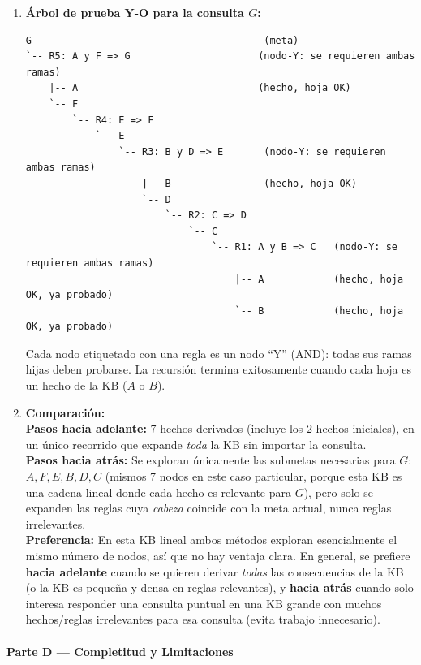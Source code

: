 \begin{enumerate}
    \item \textbf{Árbol de prueba Y-O para la consulta $G$:}
\begin{verbatim}
G                                        (meta)
`-- R5: A y F => G                      (nodo-Y: se requieren ambas ramas)
    |-- A                               (hecho, hoja OK)
    `-- F
        `-- R4: E => F
            `-- E
                `-- R3: B y D => E       (nodo-Y: se requieren ambas ramas)
                    |-- B                (hecho, hoja OK)
                    `-- D
                        `-- R2: C => D
                            `-- C
                                `-- R1: A y B => C   (nodo-Y: se requieren ambas ramas)
                                    |-- A            (hecho, hoja OK, ya probado)
                                    `-- B            (hecho, hoja OK, ya probado)

\end{verbatim}
    Cada nodo etiquetado con una regla es un nodo ``Y'' (AND): todas sus ramas hijas deben probarse.
    La recursión termina exitosamente cuando cada hoja es un hecho de la KB ($A$ o $B$).

    \item \textbf{Comparación:}\\
    \textbf{Pasos hacia adelante:} 7 hechos derivados (incluye los 2 hechos iniciales), en un único
    recorrido que expande \emph{toda} la KB sin importar la consulta.\\
    \textbf{Pasos hacia atrás:} Se exploran únicamente las submetas necesarias para $G$: $A, F, E, B,
    D, C$ (mismos 7 nodos en este caso particular, porque esta KB es una cadena lineal donde cada
    hecho es relevante para $G$), pero solo se expanden las reglas cuya \emph{cabeza} coincide con la
    meta actual, nunca reglas irrelevantes.\\
    \textbf{Preferencia:} En esta KB lineal ambos métodos exploran esencialmente el mismo número de
    nodos, así que no hay ventaja clara. En general, se prefiere \textbf{hacia adelante} cuando se
    quieren derivar \emph{todas} las consecuencias de la KB (o la KB es pequeña y densa en reglas
    relevantes), y \textbf{hacia atrás} cuando solo interesa responder una consulta puntual en una KB
    grande con muchos hechos/reglas irrelevantes para esa consulta (evita trabajo innecesario).
\end{enumerate}

\paragraph{Parte D --- Completitud y Limitaciones}

